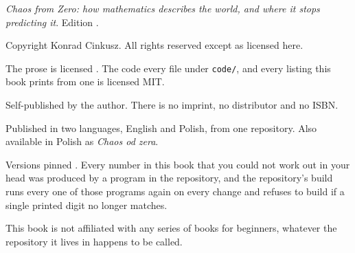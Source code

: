 
\thispagestyle{empty}
\vspace*{\fill}

{\small\color{mgrey}\raggedright\setlength{\parindent}{0pt}%
\emph{Chaos from Zero: how mathematics describes the world, and where it stops
predicting it}. Edition \bookedition.

\medskip
Copyright \textcopyright{} \bookyear{} Konrad Cinkusz. All rights reserved
except as licensed here.

\medskip
The prose is licensed \proselicence{}. The code \dash{} every file under
\texttt{code/}, and every listing this book prints from one \dash{} is
licensed MIT.

\medskip
Self-published by the author. There is no imprint, no distributor and no
ISBN.

\medskip
Published in two languages, English and Polish, from one repository. Also
available in Polish as \emph{Chaos od zera}.

\medskip
Versions pinned \pinnedon. Every number in this book that you could not
work out in your head was produced by a program in the repository, and the
repository's build runs every one of those programs again on every change and
refuses to build if a single printed digit no longer matches.

\medskip
This book is not affiliated with any series of books for beginners, whatever
the repository it lives in happens to be called.
\par}

\clearpage
